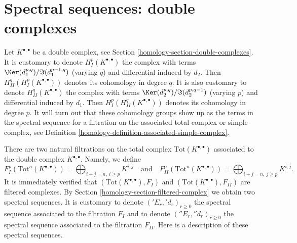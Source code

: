 \section{Spectral sequences: double complexes}
\label{homology-section-double-complex}
Let $K^{\bullet, \bullet}$ be a double complex, see
Section \ref{homology-section-double-complexes}. It is customary to denote
$H^p_I(K^{\bullet, \bullet})$
the complex with terms $\Ker(d_1^{p, q})/\Im(d_1^{p - 1, q})$
(varying $q$) and differential induced by $d_2$.
Then $H^q_{II}(H^p_I(K^{\bullet, \bullet}))$ denotes its cohomology in
degree $q$. It is also customary to denote $H^q_{II}(K^{\bullet, \bullet})$
the complex with terms $\Ker(d_2^{p, q})/\Im(d_2^{p, q - 1})$
(varying $p$) and differential induced by $d_1$.
Then $H^p_I(H^q_{II}(K^{\bullet, \bullet}))$ denotes its cohomology in
degree $p$. It will turn out that these cohomology groups show up
as the terms in the spectral sequence for a filtration on the
associated total complex or simple complex, see
Definition \ref{homology-definition-associated-simple-complex}.

\medskip\noindent
There are two natural filtrations on the total complex
$\text{Tot}(K^{\bullet, \bullet})$
associated to the double complex $K^{\bullet, \bullet}$. Namely, we
define
$$
F_I^p(\text{Tot}^n(K^{\bullet, \bullet})) =
\bigoplus\nolimits_{i + j = n, \ i \geq p} K^{i, j}
\quad
\text{and}
\quad
F_{II}^p(\text{Tot}^n(K^{\bullet, \bullet})) =
\bigoplus\nolimits_{i + j = n, \ j \geq p} K^{i, j}.
$$
It is immediately verified that $(\text{Tot}(K^{\bullet, \bullet}), F_I)$ and
$(\text{Tot}(K^{\bullet, \bullet}), F_{II})$ are filtered complexes.
By Section \ref{homology-section-filtered-complex}
we obtain two spectral sequences. It is customary to
denote $({}'E_r, {}'d_r)_{r \geq 0}$ the spectral sequence associated
to the filtration $F_I$ and to denote $({}''E_r, {}''d_r)_{r \geq 0}$
the spectral sequence associated to the filtration $F_{II}$.
Here is a description of these spectral sequences.

